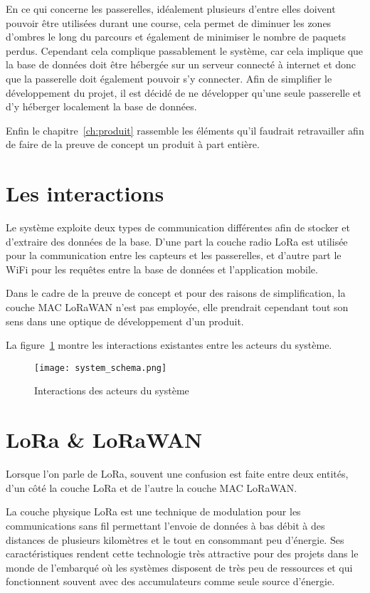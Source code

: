 En ce qui concerne les passerelles, idéalement plusieurs d'entre elles doivent pouvoir être utilisées durant une course, cela permet de diminuer les zones d'ombres le long du parcours et également de minimiser le nombre de paquets perdus. Cependant cela complique passablement le système, car cela implique que la base de données doit être hébergée sur un serveur connecté à internet et donc que la passerelle doit également pouvoir s'y connecter. Afin de simplifier le développement du projet, il est décidé de ne développer qu'une seule passerelle et d'y héberger localement la base de données.

Enfin le chapitre~\ref{ch:produit} rassemble les éléments qu'il faudrait retravailler afin de faire de la preuve de concept un produit à part entière.

\section{Les interactions}

Le système exploite deux types de communication différentes afin de stocker et d'extraire des données de la base. D'une part la couche radio LoRa est utilisée pour la communication entre les capteurs et les passerelles, et d'autre part le WiFi pour les requêtes entre la base de données et l'application mobile. 

Dans le cadre de la preuve de concept et pour des raisons de simplification, la couche MAC LoRaWAN n'est pas employée, elle prendrait cependant tout son sens dans une optique de développement d'un produit.

La figure~\ref{fig:system_schema} montre les interactions existantes entre les acteurs du système.

\begin{figure}[htb]
\centering 
\texttt{[image: system\_schema.png]} 
\caption{Interactions des acteurs du système}
\label{fig:system_schema}
\end{figure}


\section{LoRa \& LoRaWAN}

Lorsque l'on parle de LoRa, souvent une confusion est faite entre deux entités, d'un côté la couche LoRa et de l'autre la couche MAC LoRaWAN.

La couche physique LoRa est une technique de modulation pour les communications sans fil permettant l'envoie de données à bas débit à des distances de plusieurs kilomètres et le tout en consommant peu d'énergie. Ses caractéristiques rendent cette technologie très attractive pour des projets dans le monde de l'embarqué où les systèmes disposent de très peu de ressources et qui fonctionnent souvent avec des accumulateurs comme seule source d'énergie.

